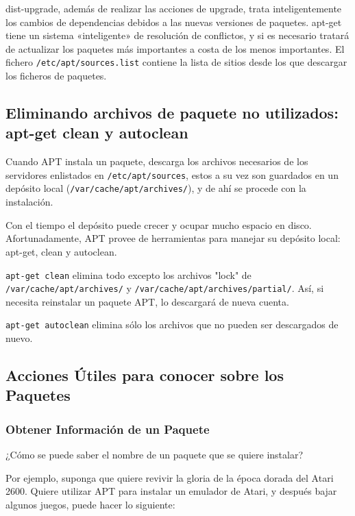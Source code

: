 \documentclass[12pt]{article}
\begin{document}
           dist-upgrade, además de realizar las acciones de upgrade, trata
           inteligentemente los cambios de dependencias debidos a las nuevas
           versiones de paquetes.  apt-get tiene un sistema «inteligente» de
           resolución de conflictos, y si es necesario tratará de actualizar
           los paquetes más importantes a costa de los menos importantes. El
           fichero \texttt{/etc/apt/sources.list} contiene la lista de sitios desde los
           que descargar los ficheros de paquetes. 

\subsection*{Eliminando archivos de paquete no utilizados: apt-get clean y autoclean}

Cuando APT instala un paquete, descarga los archivos necesarios de los servidores enlistados en \texttt{/etc/apt/sources}, estos a su vez son guardados en un depósito local (\texttt{/var/cache/apt/archives/}), y de ahí se procede con la instalación.

Con el tiempo el depósito puede crecer y ocupar mucho espacio en disco. Afortunadamente, APT provee de herramientas para manejar su depósito local: apt-get, clean y autoclean.

\texttt{apt-get clean} elimina todo excepto los archivos "lock" de \texttt{/var/cache/apt/archives/} y \texttt{/var/cache/apt/archives/partial/}. Así, si necesita reinstalar un paquete APT, lo descargará de nueva cuenta.

\texttt{apt-get autoclean} elimina sólo los archivos que no pueden ser descargados de nuevo.

\subsection*{Acciones Útiles para conocer sobre los Paquetes}
\subsubsection*{Obtener Información de un Paquete}

 ¿Cómo se puede saber el nombre de un paquete que se quiere instalar?

Por ejemplo, suponga que quiere revivir la gloria de la época dorada del Atari 2600. Quiere utilizar APT para instalar un emulador de Atari, y después bajar algunos juegos, puede hacer lo siguiente:
\end{document}
